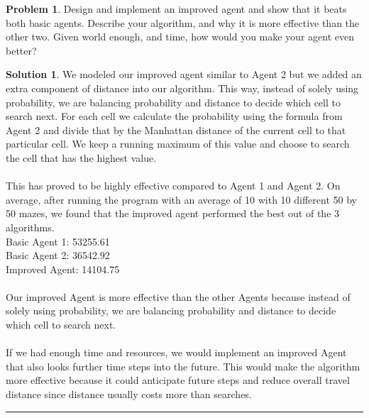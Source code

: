 \documentclass{article}
\theoremstyle{definition}
\newtheorem{problem}{Problem}
\def\fline{\rule{0.75\linewidth}{0.5pt}}
\newcommand{\finishline}{\vspace{-15pt}\begin{center}\fline\end{center}}
\newtheorem*{solution*}{Solution}
\newenvironment{solution}{\begin{solution*}}{{\finishline} \end{solution*}}
\begin{document}
\begin{problem}
Design and implement an improved agent and show that it beats both basic agents.  Describe your algorithm, and why it is more effective than the other two.  Given world enough, and time, how would you make your agent even better?
\end{problem}
\smallskip
\begin{solution} \hfill

We modeled our improved agent similar to Agent 2 but we added an extra component of distance into our algorithm. This way, instead of solely using probability, we are balancing probability and distance to decide which cell to search next. For each cell we calculate the probability using the formula from Agent 2 and divide that by the Manhattan distance of the current cell to that particular cell. We keep a running maximum of this value and choose to search the cell that has the highest value. \\\\
This has proved to be highly effective compared to Agent 1 and Agent 2. On average, after running the program with an average of 10 with 10 different 50 by 50 mazes, we found that the improved agent performed the best out of the 3 algorithms. \\
Basic Agent 1: 53255.61\\
Basic Agent 2: 36542.92\\
Improved Agent: 14104.75\\\\
Our improved Agent is more effective than the other Agents because instead of solely using probability, we are balancing probability and distance to decide which cell to search next.\\\\
If we had enough time and resources, we would implement an improved Agent that also looks further time steps into the future. This would make the algorithm more effective because it could anticipate future steps and reduce overall travel distance since distance usually costs more than searches.

\end{solution}

\smallskip
\end{document}
